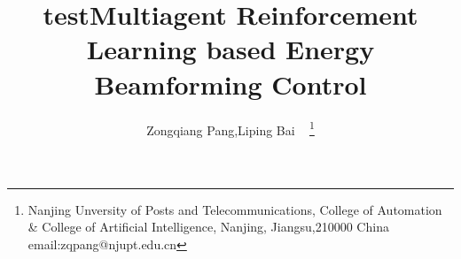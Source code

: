 %
%






\documentclass[journal]{IEEEtran}



\usepackage{amsmath,amssymb,amsfonts}
\usepackage{tabularx}
\usepackage[utf8]{inputenc} %
\usepackage[T1]{fontenc}    %
\usepackage{url}            %
\usepackage{booktabs}       %
\usepackage{amsfonts}       %
\usepackage{nicefrac}       %
\usepackage{microtype}      %
\usepackage{graphicx}
\usepackage{float}
\usepackage{multicol}
\usepackage{caption}
\usepackage{subcaption}
\usepackage{amsmath}
\usepackage{algorithm}
\usepackage{algpseudocode}
\usepackage{tikz}
\usetikzlibrary{trees}
\usepackage{listings}

\DeclareMathOperator*{\argmax}{arg\,max}  %
\DeclareMathOperator*{\argmin}{arg\,min}  %

\usepackage{textcomp}


\usepackage{xcolor,soul,framed} %

\usepackage[noadjust]{cite}
%




    \title{test}
\title{Multiagent Reinforcement Learning based Energy Beamforming Control}
\author{ Zongqiang Pang,Liping Bai ~ \thanks{Nanjing Unversity of Posts and Telecommunications, College of Automation \& College of Artificial Intelligence, Nanjing, Jiangsu,210000 China email:zqpang@njupt.edu.cn}}


